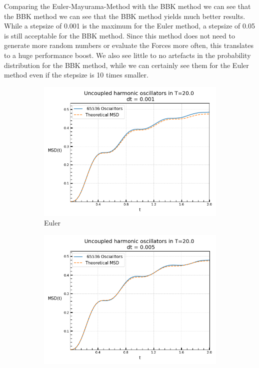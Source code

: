 	Comparing the Euler-Mayurama-Method with the BBK method we can see that the BBK method we can see that the BBK method yields much better results. While a stepsize of 0.001 is the maximum for the Euler method, a stepsize of 0.05 is still acceptable for the BBK method. Since this method does not need to generate more random numbers or evaluate the Forces more often, this translates to a huge performance boost. We also see little to no artefacts in the probability distribution for the BBK method, while we can certainly see them for the Euler method even if the stepsize is 10 times smaller.
	
	\begin{figure}[htp]
		\begin{subfigure}{0.5\textwidth}
			\centering
			\includegraphics[width=0.8\linewidth]{graphics/MSD-Euler-0.001.png}
			\caption{Euler}
		\end{subfigure}
		\begin{subfigure}{0.5\textwidth}
			\centering
			\includegraphics[width=0.8\linewidth]{graphics/MSD-BBK-0.005.png}

\end{subfigure}
\end{figure}
